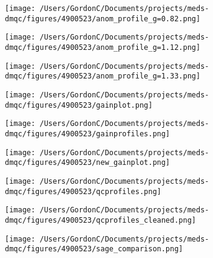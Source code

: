 \begin{figure}[H]
	\centering
	\texttt{[image: /Users/GordonC/Documents/projects/meds-dmqc/figures/4900523/anom\_profile\_g=0.82.png]}
	\caption{}
\end{figure}


\begin{figure}[H]
	\centering
	\texttt{[image: /Users/GordonC/Documents/projects/meds-dmqc/figures/4900523/anom\_profile\_g=1.12.png]}
	\caption{}
\end{figure}


\begin{figure}[H]
	\centering
	\texttt{[image: /Users/GordonC/Documents/projects/meds-dmqc/figures/4900523/anom\_profile\_g=1.33.png]}
	\caption{}
\end{figure}


\begin{figure}[H]
	\centering
	\texttt{[image: /Users/GordonC/Documents/projects/meds-dmqc/figures/4900523/gainplot.png]}
	\caption{}
\end{figure}


\begin{figure}[H]
	\centering
	\texttt{[image: /Users/GordonC/Documents/projects/meds-dmqc/figures/4900523/gainprofiles.png]}
	\caption{}
\end{figure}


\begin{figure}[H]
	\centering
	\texttt{[image: /Users/GordonC/Documents/projects/meds-dmqc/figures/4900523/new\_gainplot.png]}
	\caption{}
\end{figure}


\begin{figure}[H]
	\centering
	\texttt{[image: /Users/GordonC/Documents/projects/meds-dmqc/figures/4900523/qcprofiles.png]}
	\caption{}
\end{figure}


\begin{figure}[H]
	\centering
	\texttt{[image: /Users/GordonC/Documents/projects/meds-dmqc/figures/4900523/qcprofiles\_cleaned.png]}
	\caption{}
\end{figure}


\begin{figure}[H]
	\centering
	\texttt{[image: /Users/GordonC/Documents/projects/meds-dmqc/figures/4900523/sage\_comparison.png]}
	\caption{}
\end{figure}

